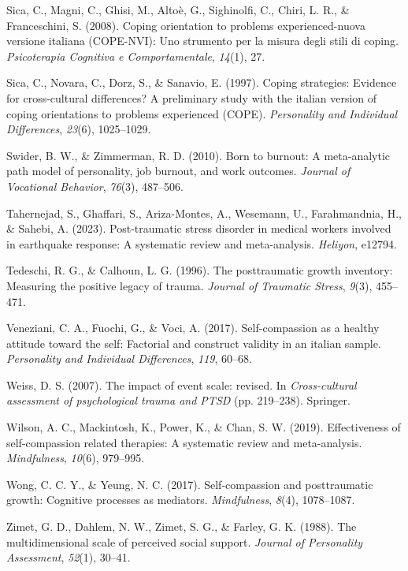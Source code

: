 \documentclass[
  man]{apa6}
\newlength{\cslhangindent}
\newlength{\cslentryspacingunit} %
\newenvironment{CSLReferences}[2] %
 {%
  \setlength{\parindent}{0pt}
  \ifodd #1
  \let\oldpar\par
  \def\par{\hangindent=\cslhangindent\oldpar}
  \fi
  \setlength{\parskip}{#2\cslentryspacingunit}
 }%
 {}
\begin{document}
\begin{CSLReferences}{1}{0}
\leavevmode{}%
Sica, C., Magni, C., Ghisi, M., Altoè, G., Sighinolfi, C., Chiri, L. R., \& Franceschini, S. (2008). Coping orientation to problems experienced-nuova versione italiana (COPE-NVI): Uno strumento per la misura degli stili di coping. \emph{Psicoterapia Cognitiva e Comportamentale}, \emph{14}(1), 27.

\leavevmode{}%
Sica, C., Novara, C., Dorz, S., \& Sanavio, E. (1997). Coping strategies: Evidence for cross-cultural differences? A preliminary study with the italian version of coping orientations to problems experienced (COPE). \emph{Personality and Individual Differences}, \emph{23}(6), 1025--1029.

\leavevmode{}%
Swider, B. W., \& Zimmerman, R. D. (2010). Born to burnout: A meta-analytic path model of personality, job burnout, and work outcomes. \emph{Journal of Vocational Behavior}, \emph{76}(3), 487--506.

\leavevmode{}%
Tahernejad, S., Ghaffari, S., Ariza-Montes, A., Wesemann, U., Farahmandnia, H., \& Sahebi, A. (2023). Post-traumatic stress disorder in medical workers involved in earthquake response: A systematic review and meta-analysis. \emph{Heliyon}, e12794.

\leavevmode{}%
Tedeschi, R. G., \& Calhoun, L. G. (1996). The posttraumatic growth inventory: Measuring the positive legacy of trauma. \emph{Journal of Traumatic Stress}, \emph{9}(3), 455--471.

\leavevmode{}%
Veneziani, C. A., Fuochi, G., \& Voci, A. (2017). Self-compassion as a healthy attitude toward the self: Factorial and construct validity in an italian sample. \emph{Personality and Individual Differences}, \emph{119}, 60--68.

\leavevmode{}%
Weiss, D. S. (2007). The impact of event scale: revised. In \emph{Cross-cultural assessment of psychological trauma and PTSD} (pp. 219--238). Springer.

\leavevmode{}%
Wilson, A. C., Mackintosh, K., Power, K., \& Chan, S. W. (2019). Effectiveness of self-compassion related therapies: A systematic review and meta-analysis. \emph{Mindfulness}, \emph{10}(6), 979--995.

\leavevmode{}%
Wong, C. C. Y., \& Yeung, N. C. (2017). Self-compassion and posttraumatic growth: Cognitive processes as mediators. \emph{Mindfulness}, \emph{8}(4), 1078--1087.

\leavevmode{}%
Zimet, G. D., Dahlem, N. W., Zimet, S. G., \& Farley, G. K. (1988). The multidimensional scale of perceived social support. \emph{Journal of Personality Assessment}, \emph{52}(1), 30--41.

\end{CSLReferences}
\end{document}

